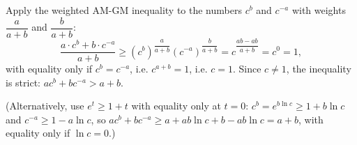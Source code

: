 Apply the weighted AM-GM inequality to the numbers $c^b$ and $c^{-a}$ with weights $\dfrac {a}{a+b}$ and $\dfrac {b}{a+b}$:
\[\dfrac{a\cdot c^b+b\cdot c^{-a}}{a+b}\ge\left(c^b\right)^{\dfrac {a}{a+b}}\left(c^{-a}\right)^{\dfrac {b}{a+b}}=c^{\dfrac{ab-ab}{a+b}}=c^0=1,\]
with equality only if $c^b=c^{-a}$, i.e. $c^{a+b}=1$, i.e. $c=1$. Since $c\ne1$, the inequality is strict: $ac^b+bc^{-a}>a+b$.

(Alternatively, use $e^t\ge1+t$ with equality only at $t=0$: $c^b=e^{b\ln c}\ge1+b\ln c$ and $c^{-a}\ge1-a\ln c$, so $ac^b+bc^{-a}\ge a+ab\ln c+b-ab\ln c=a+b$, with equality only if $\ln c=0$.)
